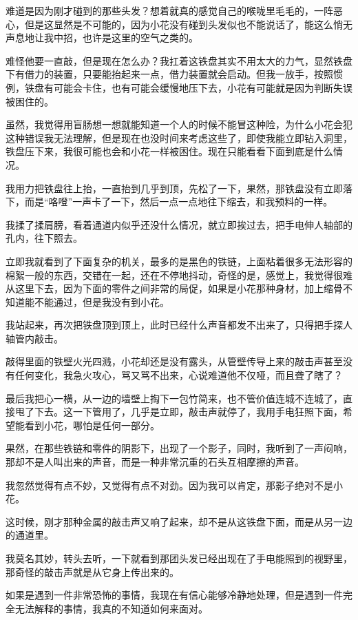 难道是因为刚才碰到的那些头发？想着就真的感觉自己的喉咙里毛毛的，一阵恶心，但是这显然是不可能的，因为小花没有碰到头发似也不能说话了，能这么悄无声息地让我中招，也许是这里的空气之类的。

难怪他要一直敲，但是现在怎么办？我扛着这铁盘其实不用太大的力气，显然铁盘下有借力的装置，只要能抬起来一点，借力装置就会启动。但我一放手，按照惯例，铁盘有可能会卡住，也有可能会缓慢地压下去，小花有可能就是因为判断失误被困住的。

虽然，我觉得用盲肠想一想就能知道一个人的时候不能冒这种险，为什么小花会犯这种错误我无法理解，但是现在也没时间来考虑这些了，即使我能立即钻入洞里，铁盘压下来，我很可能也会和小花一样被困住。现在只能看看下面到底是什么情况。

我用力把铁盘往上抬，一直抬到几乎到顶，先松了一下，果然，那铁盘没有立即落下，而是“咯噔”一声卡了一下，然后一点一点地往下缩去，和我预料的一样。

我揉了揉肩膀，看着通道内似乎还没什么情况，就立即挨过去，把手电伸人轴部的孔内，往下照去。

立即我就看到了下面复杂的机关，最多的是黑色的铁链，上面粘着很多无法形容的棉絮一般的东西，交错在一起，还在不停地抖动，奇怪的是，感觉上，我觉得很难从这里下去，因为下面的零件之间非常的局促，如果是小花那种身材，加上缩骨不知道能不能通过，但是我没有到小花。

我站起来，再次把铁盘顶到顶上，此时已经什么声音都发不出来了，只得把手探人轴管内敲击。

敲得里面的铁壁火光四溅，小花却还是没有露头，从管壁传导上来的敲击声甚至没有任何变化，我急火攻心，骂又骂不出来，心说难道他不仅哑，而且聋了瞎了？

最后我把心一横，从一边的墙壁上掏下一包竹简来，也不管价值连城不连城了，直接甩了下去。这一下管用了，几乎是立即，敲击声就停了，我用手电狂照下面，希望能看到小花，哪怕是任何一部分。

果然，在那些铁链和零件的阴影下，出现了一个影子，同时，我听到了一声闷响，那却不是人叫出来的声音，而是一种非常沉重的石头互相摩擦的声音。

我忽然觉得有点不妙，又觉得有点不对劲。因为我可以肯定，那影子绝对不是小花。

这时候，刚才那种金属的敲击声又响了起来，却不是从这铁盘下面，而是从另一边的通道里。

我莫名其妙，转头去听，一下就看到那团头发已经出现在了手电能照到的视野里，那奇怪的敲击声就是从它身上传出来的。

如果是遇到一件非常恐怖的事情，我现在有信心能够冷静地处理，但是遇到一件完全无法解释的事情，我真的不知道如何来面对。

